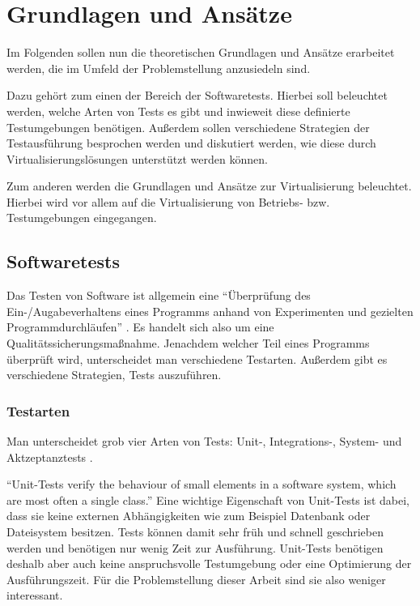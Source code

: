 \section{Grundlagen und Ansätze}

Im Folgenden sollen nun die theoretischen Grundlagen und Ansätze erarbeitet werden, die im Umfeld der Problemstellung anzusiedeln sind.

Dazu gehört zum einen der Bereich der Softwaretests. Hierbei soll beleuchtet werden, welche Arten von Tests es gibt und inwieweit diese definierte Testumgebungen benötigen. Außerdem sollen verschiedene Strategien der Testausführung besprochen werden und diskutiert werden, wie diese durch Virtualisierungslösungen unterstützt werden können.

Zum anderen werden die Grundlagen und Ansätze zur Virtualisierung beleuchtet. Hierbei wird vor allem auf die Virtualisierung von Betriebs- bzw. Testumgebungen eingegangen.

\subsection{Softwaretests}

Das Testen von Software ist allgemein eine "`Überprüfung des Ein-/Augabeverhaltens eines Programms anhand von Experimenten und gezielten Programmdurchläufen"' \citep[S.][S.662]{itduden}. Es handelt sich also um eine Qualitätssicherungsmaßnahme. Jenachdem welcher Teil eines Programms überprüft wird, unterscheidet man verschiedene Testarten. Außerdem gibt es verschiedene Strategien, Tests auszuführen.

\subsubsection{Testarten}

Man unterscheidet grob vier Arten von Tests: Unit-, Integrations-, System- und Aktzeptanztests \citep[Vgl.][S. 129 ff]{DuvMatAnd07}.


"`Unit-Tests verify the behaviour of small elements in a software system, which are most often a single class."' \citep[S.][S. 132]{DuvMatAnd07} Eine wichtige Eigenschaft von Unit-Tests ist dabei, dass sie keine externen Abhängigkeiten wie zum Beispiel Datenbank oder Dateisystem besitzen. Tests können damit sehr früh und schnell geschrieben werden und benötigen nur wenig Zeit zur Ausführung. \citep[Vgl.][S. 133]{DuvMatAnd07} Unit-Tests benötigen deshalb aber auch keine anspruchsvolle Testumgebung oder eine Optimierung der Ausführungszeit. Für die Problemstellung dieser Arbeit sind sie also weniger interessant.

